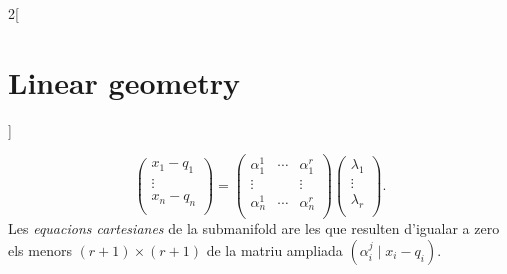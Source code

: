 \documentclass[class=article,10pt,crop=false]{standalone}
\begin{document}
\begin{multicols}{2}[\section{Linear geometry}]
\begin{definition}
$$\begin{pmatrix}
x_1-q_1 \\
\vdots \\
x_n-q_n \\
\end{pmatrix}=\begin{pmatrix}
\alpha_1^1 & \cdots & \alpha_1^r \\
\vdots & & \vdots \\
\alpha_n^1 & \cdots & \alpha_n^r \\
\end{pmatrix}\begin{pmatrix}
\lambda_1 \\
\vdots \\
\lambda_r \\
\end{pmatrix}.$$ Les \textit{equacions cartesianes} de la submanifold are les que resulten d'igualar a zero els menors $(r+1)\times(r+1)$ de la matriu ampliada $\left(\alpha_i^j\mid x_i-q_i\right)$.
\end{definition}

\end{multicols}
\end{document}
